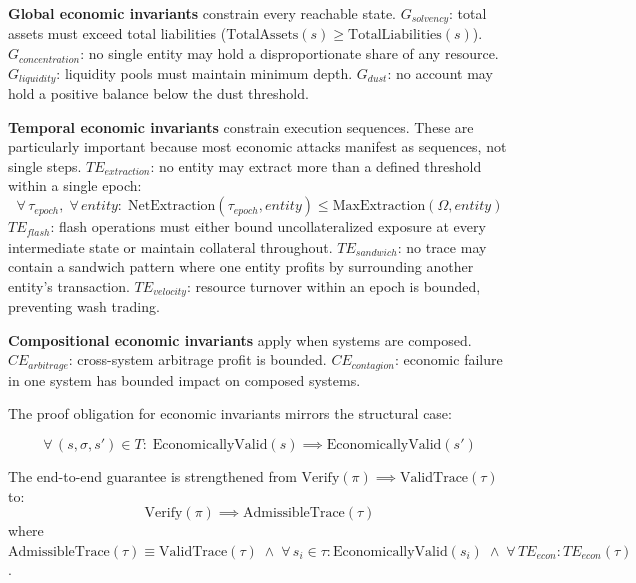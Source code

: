 \documentclass[11pt,a4paper]{article}
\theoremstyle{definition}
\newcommand{\Verify}{\mathrm{Verify}}
\newcommand{\ValidTrace}{\mathrm{ValidTrace}}
\begin{document}
\noindent\textbf{Global economic invariants} constrain every reachable state. $G_{\mathit{solvency}}$: total assets must exceed total liabilities ($\mathrm{TotalAssets}(s) \geq \mathrm{TotalLiabilities}(s)$). $G_{\mathit{concentration}}$: no single entity may hold a disproportionate share of any resource. $G_{\mathit{liquidity}}$: liquidity pools must maintain minimum depth. $G_{\mathit{dust}}$: no account may hold a positive balance below the dust threshold.

\noindent\textbf{Temporal economic invariants} constrain execution sequences. These are particularly important because most economic attacks manifest as sequences, not single steps. $\mathit{TE}_{\mathit{extraction}}$: no entity may extract more than a defined threshold within a single epoch:
\begin{equation}
\forall\, \tau_{\mathit{epoch}},\; \forall\, \mathit{entity}:\; \mathrm{NetExtraction}(\tau_{\mathit{epoch}}, \mathit{entity}) \leq \mathrm{MaxExtraction}(\Omega, \mathit{entity})
\end{equation}
$\mathit{TE}_{\mathit{flash}}$: flash operations must either bound uncollateralized exposure at every intermediate state or maintain collateral throughout. $\mathit{TE}_{\mathit{sandwich}}$: no trace may contain a sandwich pattern where one entity profits by surrounding another entity's transaction. $\mathit{TE}_{\mathit{velocity}}$: resource turnover within an epoch is bounded, preventing wash trading.

\noindent\textbf{Compositional economic invariants} apply when systems are composed. $\mathit{CE}_{\mathit{arbitrage}}$: cross-system arbitrage profit is bounded. $\mathit{CE}_{\mathit{contagion}}$: economic failure in one system has bounded impact on composed systems.

The proof obligation for economic invariants mirrors the structural case:

\begin{equation}
\forall\, (s, \sigma, s') \in T:\; \mathrm{EconomicallyValid}(s) \implies \mathrm{EconomicallyValid}(s')
\end{equation}

The end-to-end guarantee is strengthened from $\Verify(\pi) \implies \ValidTrace(\tau)$ to:
\begin{equation}
\label{eq:admissible-guarantee}
\Verify(\pi) \implies \mathrm{AdmissibleTrace}(\tau)
\end{equation}
where $\mathrm{AdmissibleTrace}(\tau) \equiv \ValidTrace(\tau) \;\land\; \forall\, s_i \in \tau: \mathrm{EconomicallyValid}(s_i) \;\land\; \forall\, \mathit{TE}_{\mathit{econ}}: \mathit{TE}_{\mathit{econ}}(\tau)$.
\end{document}
